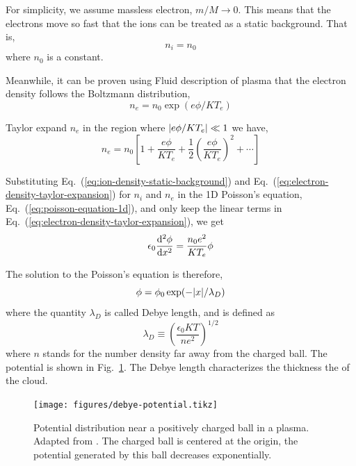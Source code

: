 For simplicity, we assume massless electron, $m/M \to 0$. This means that the electrons move so fast that the ions can be treated as a static background. That is,
\begin{equation}
	n_i = n_0
	\label{eq:ion-density-static-background}
\end{equation}
where $n_0$ is a constant.

Meanwhile, it can be proven using Fluid description of plasma that the electron density follows the Boltzmann distribution,
\begin{equation}
	n_e = n_0\exp(e\phi/KT_e)
\end{equation}

Taylor expand $n_e$ in the region where $\abs{e\phi/KT_e} \ll 1$ we have,
\begin{equation}
	n_e = n_0\left[ 1 + \frac{e\phi}{KT_e} + \frac{1}{2}\left(\frac{e\phi}{KT_e}\right)^2 + \cdots \right]
	\label{eq:electron-density-taylor-expansion}
\end{equation}

Substituting Eq.~(\ref{eq:ion-density-static-background}) and Eq.~(\ref{eq:electron-density-taylor-expansion}) for $n_i$ and $n_e$ in the 1D Poisson's equation, Eq.~(\ref{eq:poisson-equation-1d}), and only keep the linear terms in Eq.~(\ref{eq:electron-density-taylor-expansion}), we get
\begin{equation}
	\epsilon_0\dv[2]{\phi}{x} = \frac{n_0e^2}{KT_e}\phi
\end{equation}

The solution to the Poisson's equation is therefore,
\begin{equation}
	\phi = \phi_0\exp(-\abs{x}/\lambda_D)
\end{equation}
where the quantity $\lambda_D$ is called Debye length, and is defined as
\begin{equation}
	\lambda_D \equiv \left(\frac{\epsilon_0 KT}{ne^2}\right)^{1/2}
	\label{eq:debye-length}
\end{equation}
where $n$ stands for the number density far away from the charged ball. The potential is shown in Fig.~\ref{fig:debye-potential}. The  Debye length characterizes the thickness the of the cloud.

\begin{figure}[htbp]
	\centering
	\texttt{[image: figures/debye-potential.tikz]}
	\caption{Potential distribution near a positively charged ball in a plasma. Adapted from \cite{chen_introduction_2016}. The charged ball is centered at the origin, the potential generated by this ball decreases exponentially.}
	\label{fig:debye-potential}
\end{figure}

